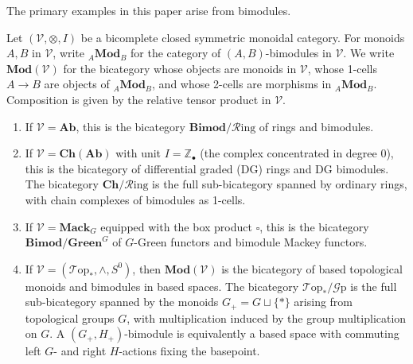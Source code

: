 \documentclass[11pt,oneside]{amsart}
\numberwithin{equation}{section}
\numberwithin{figure}{section}
\theoremstyle{plain}
\theoremstyle{definition}
\theoremstyle{remark}
\begin{document}
The primary examples in this paper arise from bimodules.

\begin{example}\label{ex:ModV}
Let $(\mathcal V,\otimes,I)$ be a bicomplete closed symmetric monoidal category. For monoids $A,B$ in $\mathcal V$, write ${}_A\mathbf{Mod}_B$ for the category of $(A,B)$-bimodules in $\mathcal V$. We write $\mathbf{Mod}(\mathcal V)$ for the bicategory whose objects are monoids in $\mathcal V$, whose 1-cells $A\to B$ are objects of ${}_A\mathbf{Mod}_B$, and whose 2-cells are morphisms in ${}_A\mathbf{Mod}_B$. Composition is given by the relative tensor product in $\mathcal{V}$.
\begin{enumerate}
    \item If $\mathcal{V} = \mathbf{Ab}$, this is the bicategory $\mathbf{Bimod}/\mathcal{R}\mathrm{ing}$ of rings and bimodules.
    \item If $\mathcal{V} = \mathbf{Ch}(\mathbf{Ab})$ with unit $I = \mathbb{Z}_\bullet$ (the complex concentrated in degree 0), this is the bicategory of differential graded (DG) rings and DG bimodules. The bicategory $\mathbf{Ch}/\mathcal{R}\mathrm{ing}$ is the full sub-bicategory spanned by ordinary rings, with chain complexes of bimodules as 1-cells.
    \item If $\mathcal{V} = \mathbf{Mack}_{G}$ equipped with the box product $\square$, this is the bicategory $\mathbf{Bimod}/\mathbf{Green}^{G}$ of $G$-Green functors and bimodule Mackey functors.
    \item If \(\mathcal V=(\mathcal{T}\text{op}_*,\wedge,S^0)\), then
\(\mathbf{Mod}(\mathcal V)\) is the bicategory of based topological monoids
and bimodules in based spaces. The bicategory \(\mathcal{T}\text{op}_*/\mathcal{G}\text{p}\) is the full
sub-bicategory spanned by the monoids \(G_+=G\sqcup\{*\}\) arising from
topological groups \(G\), with multiplication induced by the group multiplication
on \(G\). A \((G_+,H_+)\)-bimodule is equivalently a based space with commuting
left \(G\)- and right \(H\)-actions fixing the basepoint.
\end{enumerate}
\end{example}
 
\end{document}
